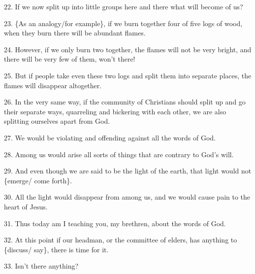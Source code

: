 22. If we now split up into little groups here and there what will become of us?

23. \{As an analogy/for example\}, if we burn together four of five logs of wood,
when they burn there will be abundant flames.

24. However, if we only burn two together, the flames will not be very bright,
and there will be very few of them, won't there!

25. But if people take even these two logs and split them into separate places,
the flames will disappear altogether.

26. In the very same way, if the community of Christians should split up and go
their separate ways, quarreling and bickering with each other, we are also splitting
ourselves apart from God.

27. We would be violating and offending against all the words of God.

28. Among us would arise all sorts of things that are contrary to God's will.

29. And even though we are said to be the light of the earth, that light would
not \{emerge/ come forth\}.

30. All the light would disappear from among us, and we would cause pain to the
heart of Jesus.

31. Thus today am I teaching you, my brethren, about the words of God.

32. At this point if our headman, or the committee of elders, has anything to \{discuss/
say\}, there is time for it.

33. Isn't there anything?

